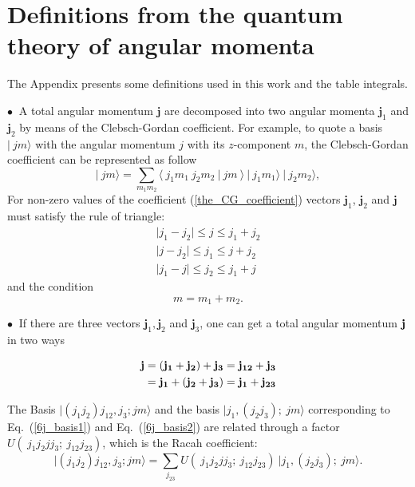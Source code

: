 
\chapter{Definitions from the quantum theory of angular momenta} %

\label{AppendixA} %
The Appendix presents some definitions used in this work and the table integrals.

$\bullet~$ A total angular momentum $\mathbf{j}$ are decomposed into two angular momenta $\mathbf{j}_1$ and $\mathbf{j}_2$ by means of the Clebsch-Gordan coefficient. For example, to quote a basis $\vert ~ jm \rangle $ with the angular momentum $ j$ with its $z$-component $m$, the Clebsch-Gordan coefficient can be represented as follow
\begin{equation}
\label{the_CG_coefficient}
\vert ~ jm \rangle =\sum_{m_1 m_2} \langle ~ j_1 m_1~j_2 m_2~ \vert ~j m~  \rangle ~ \vert ~j_1 m_1 \rangle~ \vert ~j_2 m_2 \rangle,
\end{equation}
For non-zero values of the coefficient (\ref{the_CG_coefficient}) vectors $\mathbf{j}_1$, $\mathbf{j}_2$ and $\mathbf{j}$ must satisfy the rule of triangle:
\begin{align*}
\vert j_1 - j_2 \vert \leq j \leq j_1 + j_2 \\
\vert j - j_2 \vert \leq j_1 \leq j + j_2 \\ 
\vert j_1 - j \vert \leq j_2 \leq j_1 + j 
\end{align*}
and the condition
\begin{equation*}
m=m_1+m_2.
\end{equation*}


$\bullet~$  If there are three vectors $\mathbf{j}_1, \mathbf{j}_2$ and $\mathbf{j}_3$, one can get a total angular momentum $\bf j$ in two ways

\begin{align}
\label{6j_basis1}
\bf j & =\bf \left( j_1 + j_2 \right) + j_3 = j_{12} + j_3 \\
\label{6j_basis2}		
& = \bf j_1 + \left( j_2  + j_3 \right) = j_1 +j_{23}
\end{align}

The Basis $ \vert (j_1 j_2)j_{12},j_3; jm \rangle$ and the basis $\vert j_1,(j_2 j_3); ~jm \rangle$ corresponding to Eq.~(\ref{6j_basis1}) and Eq.~(\ref{6j_basis2}) are related through a factor $U(~j_1 j_2 j j_3;~ j_{12} j_{23})$, which is the Racah coefficient:
\begin{equation}
\vert (j_1 j_2)j_{12},j_3; jm \rangle = \sum_{j_{23}} U(~j_1 j_2 j j_3;~ j_{12} j_{23}) ~ \vert j_1,(j_2 j_3); ~jm \rangle.
\label{racah_U}
\end{equation}

